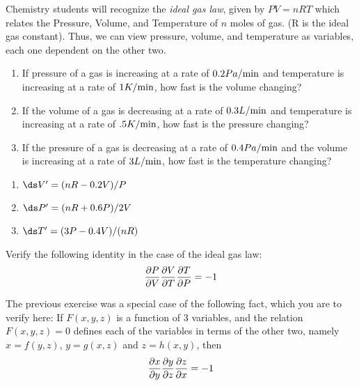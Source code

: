 \begin{enumialphparenastyle}
\begin{ex}Chemistry students will recognize the {\em ideal gas law}, given
  by $PV=nRT$ which relates the Pressure, Volume, and Temperature of
  $n$ moles of gas.  (R is the ideal gas constant).  Thus, we can view
  pressure, volume, and temperature as variables, each one dependent
  on the other two.

\begin{enumerate}
	\item If pressure of a gas is increasing at a rate of $0.2
	  Pa/\hbox{min}$ and temperature is increasing at a rate of $1
	  K/\hbox{min}$, how fast is the volume changing?
	\item If the volume of a gas is decreasing at a rate of $0.3
	  L/\hbox{min}$ and temperature is increasing at a rate of $.5
	  K/\hbox{min}$, how fast is the pressure changing?
	\item If the pressure of a gas is decreasing at a rate of $0.4
	  Pa/\hbox{min}$ and the volume is increasing at a rate of $3
	  L/\hbox{min}$, how fast is the temperature changing?
\end{enumerate}
\begin{sol}
\begin{enumerate}
	\item	$\ds V'=(nR-0.2V)/P$
	\item	$\ds P'=(nR+0.6P)/2V$
	\item	$\ds T' = (3P-0.4V)/(nR)$
\end{enumerate}
\end{sol}
\end{ex}

\begin{ex}
Verify the following identity in the case of the ideal gas law:
$${\partial P\over \partial V} {\partial V\over \partial T} 
{\partial T\over \partial P}=-1$$
\end{ex}

\begin{ex}
The previous exercise was a special case of the following
fact, which you are to verify here: If $F(x,y,z)$ is a function of 3
variables, and the relation $F(x,y,z)=0$ defines each of the variables
in terms of the other two, namely $x=f(y,z)$, $y=g(x,z)$ and
$z=h(x,y)$, then
$${\partial x\over \partial y} {\partial y\over \partial z} 
{\partial z\over \partial x}=-1$$
\end{ex}

\end{enumialphparenastyle}
